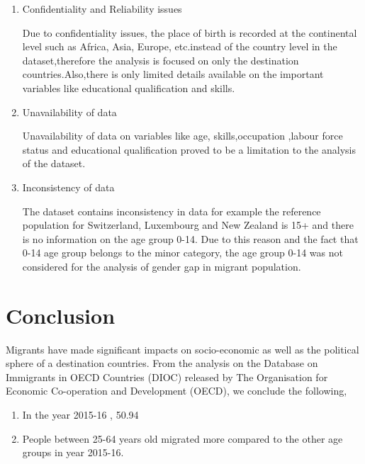 \documentclass[11pt,a4paper,]{article}
\begin{document}
\begin{enumerate}

   \item Confidentiality and Reliability issues 

Due to confidentiality issues, the place of birth is recorded at the continental level such as Africa, Asia, Europe, etc.instead of the country level in the dataset,therefore the analysis is focused on only the destination countries.Also,there is only limited details available on the important variables like educational qualification and skills. 

   \item Unavailability of data

Unavailability of data on variables like age, skills,occupation ,labour force status and educational qualification proved to be a limitation to the analysis of the dataset.

 \item  Inconsistency of data
 
 The dataset contains inconsistency in data for example the reference population for Switzerland, Luxembourg and New Zealand is 15+ and there is no information on the age group 0-14. Due to this reason and the fact that 0-14 age group belongs to the minor category, the age group 0-14  was not considered for the analysis of gender gap in migrant population.  
 
 \end{enumerate}

\section*{Conclusion}

Migrants have made significant impacts on socio-economic as well as the political sphere of a destination countries. From the analysis on the Database on Immigrants in OECD Countries (DIOC) released by The Organisation for Economic Co-operation and Development (OECD), we conclude the following,

\begin{enumerate}

\item In the year 2015-16 , 50.94 %

\item People between 25-64 years old migrated more compared to the other age groups in year 2015-16. 

\end{enumerate}
\end{document}
